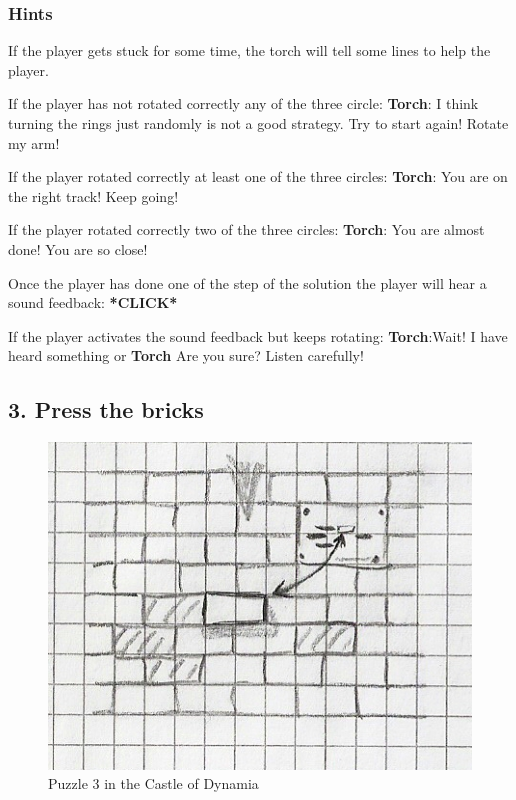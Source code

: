 \subsubsection*{Hints}
If the player gets stuck for some time, the torch will tell some lines to help the player.

If the player has not rotated correctly any of the three circle:
\textbf{Torch}: I think turning the rings just randomly is not a good strategy. Try to start again! Rotate my arm!

If the player rotated correctly at least one of the three circles:
\textbf{Torch}: You are on the right track! Keep going!

If the player rotated correctly two of the three circles:
\textbf{Torch}: You are almost done! You are so close!

Once the player has done one of the step of the solution the player will hear a sound feedback: 
\textbf{*CLICK*}

If the player activates the sound feedback but keeps rotating:
\textbf{Torch}:Wait! I have heard something
or
\textbf{Torch} Are you sure? Listen carefully!

\subsection{3. Press the bricks}

\begin{figure}[H]
  \centering
  \includegraphics[width=\textwidth]{Images/Puzzles/castleOfDynamia_3}
  \caption{Puzzle 3 in the Castle of Dynamia}
\end{figure}

